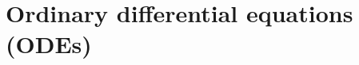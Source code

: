 \documentclass[../main.tex]{subfiles}
\begin{document}
\section{Ordinary differential equations (ODEs)}\label{sec1}



\end{document}
